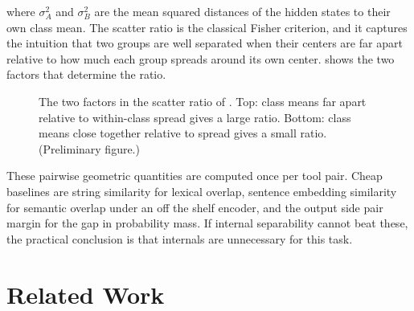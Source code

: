 where $\sigma_A^2$ and $\sigma_B^2$ are the mean squared distances of the hidden states to their own class mean.
The scatter ratio is the classical Fisher criterion, and it captures the intuition that two groups are well separated when their centers are far apart relative to how much each group spreads around its own center.
 shows the two factors that determine the ratio.

\begin{figure}[htbp]
\centering
{}
\caption{The two factors in the scatter ratio of . Top: class means far apart relative to within-class spread gives a large ratio. Bottom: class means close together relative to spread gives a small ratio. (Preliminary figure.)}
\label{fig:scatter}
\end{figure}


These pairwise geometric quantities are computed once per tool pair.
Cheap baselines are string similarity for lexical overlap, sentence embedding similarity for semantic overlap under an off the shelf encoder, and the output side pair margin for the gap in probability mass.
If internal separability cannot beat these, the practical conclusion is that internals are unnecessary for this task.

\section{Related Work}

